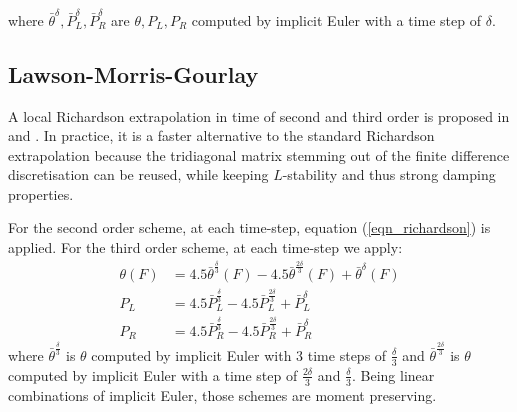 \documentclass[]{rAMF2e}
\begin{document}
where $\bar{\theta}^{\delta}, \bar{P}_L^{\delta}, \bar{P}_R^{\delta}$ are $\theta, P_L, P_R$ computed by implicit Euler with a time step of $\delta$.


\subsection{Lawson-Morris-Gourlay}
A local Richardson extrapolation in time of second and third order is proposed in \citep{lawson1978extrapolation} and \citep{gourlay1980extrapolation}. In practice, it is a faster alternative to the standard Richardson extrapolation because the tridiagonal matrix stemming out of the finite difference discretisation can be reused, while keeping $L$-stability and thus strong damping properties.

For the second order scheme, at each time-step, equation (\ref{eqn_richardson}) is applied.
For the third order scheme, at each time-step we apply:
\begin{align}\label{eqn_lmg3}
\theta(F) &= 4.5 \bar{\theta}^{\frac{\delta}{3}}(F) - 4.5 \bar{\theta}^{\frac{2\delta}{3}}(F)  + \bar{\theta}^{\delta}(F)\\
P_L &= 4.5 \bar{P}^{\frac{\delta}{3}}_L - 4.5 \bar{P}^{\frac{2\delta}{3}}_L  + \bar{P}^{\delta}_L\\
P_R &= 4.5 \bar{P}^{\frac{\delta}{3}}_R - 4.5 \bar{P}^{\frac{2\delta}{3}}_R  + \bar{P}^{\delta}_R
\end{align}
where $\bar{\theta}^{\frac{\delta}{3}}$ is $\theta$ computed by implicit Euler with 3 time steps of $\frac{\delta}{3}$ and $\bar{\theta}^{\frac{2\delta}{3}}$ is $\theta$ computed by implicit Euler with a time step of $\frac{2\delta}{3}$ and $\frac{\delta}{3}$. Being linear combinations of implicit Euler, those schemes are moment preserving.
\end{document}
